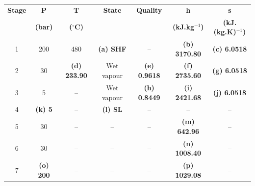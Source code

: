 \documentclass[calculator,steamtables,refrigeranttables,psychrometricchart,datasheet,solutions,resit]{exam}
\begin{document}
\begin{question}
\begin{enumerate}[(a)]
{\begin{center}
\begin{tabular}{c | c c c c c c} 
\hline
{\bf Stage} & {\bf P}       & {\bf T}            &  {\bf State}  &  {\bf Quality}  & {\bf h}             & {\bf s}                  \\
            & {\bf (bar)}   & {\bf ($^{\circ}$C)} &               &                 &{\bf (kJ.kg$^{-1}$)}  & {\bf (kJ.(kg.K)$^{-1}$)}  \\
\hline
1           &  200          & 480                &  {\bf (a) SHF}&   --            & {\bf (b) 3170.80}    & {\bf (c) 6.0518}         \\
2           &  30           & {\bf (d) 233.90}    &  Wet vapour   & {\bf (e) 0.9618}& {\bf (f) 2735.60}   & {\bf (g) 6.0518}         \\
3           &  5            & --                 &  Wet vapour   & {\bf (h) 0.8449}& {\bf (i) 2421.68}   & {\bf (j) 6.0518}          \\
4           &  {\bf (k) 5}  &  --                &  {\bf (l) SL} & --              &   --                &   --                      \\
5           &  30           &  --                &   --          &  --             & {\bf (m) 642.96}    &  --                       \\
6           &  30           &  --                &   --          &  --             & {\bf (n) 1008.40}    &  --                       \\
7           &  {\bf (o) 200}&  --                &   --          &  --             & {\bf (p) 1029.08}   &  --                       \\
\hline
\end{tabular}
\end{center}

}


\end{enumerate}
\end{question}
\end{document}
